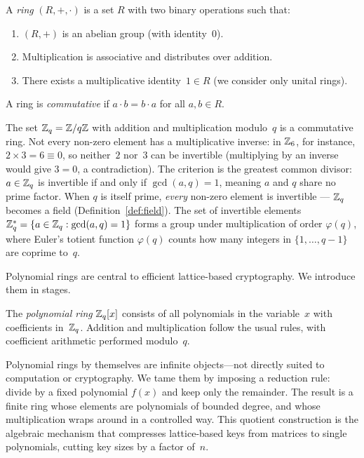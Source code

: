 \begin{definition}[Ring]
\label{def:ring}
A \emph{ring} $(R, +, \cdot)$ is a set $R$ with two binary operations such that:
\begin{enumerate}
\item $(R, +)$ is an abelian group (with identity~$0$).
\item Multiplication is associative and distributes over addition.
\item There exists a multiplicative identity~$1 \in R$ (we consider only unital rings).
\end{enumerate}
A ring is \emph{commutative} if $a \cdot b = b \cdot a$ for all $a, b \in R$.
\end{definition}

\begin{example}
\label{ex:Zq-ring}
The set $\mathbb{Z}_q = \mathbb{Z}/q\mathbb{Z}$ with addition and multiplication modulo~$q$ is a commutative ring.  Not every non-zero element has a multiplicative inverse: in $\mathbb{Z}_6$, for instance, $2 \times 3 = 6 \equiv 0$, so neither~$2$ nor~$3$ can be invertible (multiplying by an inverse would give $3 = 0$, a contradiction).  The criterion is the greatest common divisor: $a \in \mathbb{Z}_q$ is invertible if and only if $\gcd(a, q) = 1$, meaning $a$ and $q$ share no prime factor.  When $q$ is itself prime, \emph{every} non-zero element is invertible --- $\mathbb{Z}_q$ becomes a field (Definition~\ref{def:field}).  The set of invertible elements $\mathbb{Z}_q^* = \{a \in \mathbb{Z}_q : \gcd(a,q) = 1\}$ forms a group under multiplication of order $\varphi(q)$, where Euler's totient function $\varphi(q)$ counts how many integers in $\{1, \ldots, q-1\}$ are coprime to~$q$.
\end{example}

Polynomial rings are central to efficient lattice-based cryptography.  We introduce them in stages.

\begin{definition}
\label{def:poly-ring}
The \emph{polynomial ring} $\mathbb{Z}_q[x]$ consists of all polynomials in the variable~$x$ with coefficients in~$\mathbb{Z}_q$.  Addition and multiplication follow the usual rules, with coefficient arithmetic performed modulo~$q$.
\end{definition}

Polynomial rings by themselves are infinite objects---not directly suited to computation or cryptography.  We tame them by imposing a reduction rule: divide by a fixed polynomial $f(x)$ and keep only the remainder.  The result is a finite ring whose elements are polynomials of bounded degree, and whose multiplication wraps around in a controlled way.  This quotient construction is the algebraic mechanism that compresses lattice-based keys from matrices to single polynomials, cutting key sizes by a factor of~$n$.

